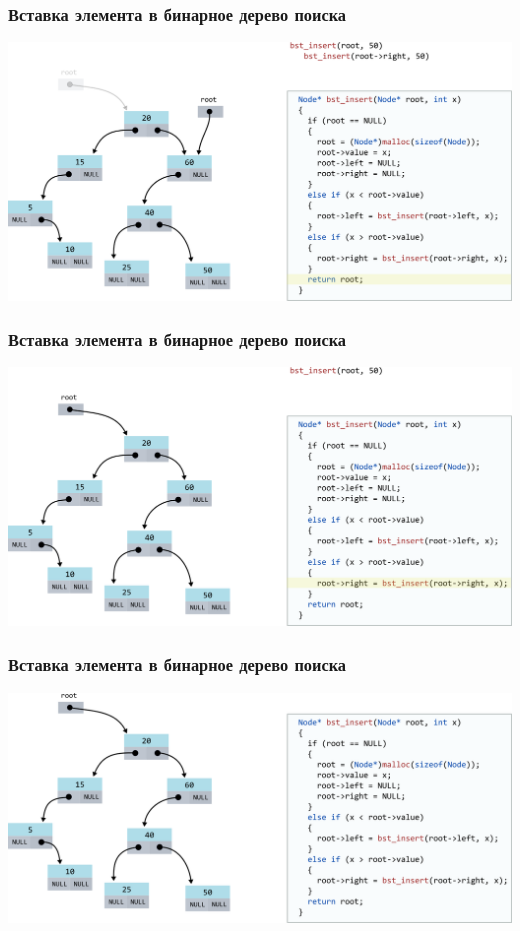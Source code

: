 \documentclass[10pt,pdf,hyperref={unicode}]{beamer}
\begin{document}
\begin{frame}[fragile]
\frametitle{Вставка элемента в бинарное дерево поиска}
\begin{center}
\includegraphics[scale=0.6]{images/tree/codetree/codetree20.png}
\end{center}
\end{frame}
\begin{frame}[fragile]
\frametitle{Вставка элемента в бинарное дерево поиска}
\begin{center}
\includegraphics[scale=0.6]{images/tree/codetree/codetree21.png}
\end{center}
\end{frame}
\begin{frame}[fragile]
\frametitle{Вставка элемента в бинарное дерево поиска}
\begin{center}
\includegraphics[scale=0.6]{images/tree/codetree/codetree22.png}
\end{center}
\end{frame}
\end{document}
